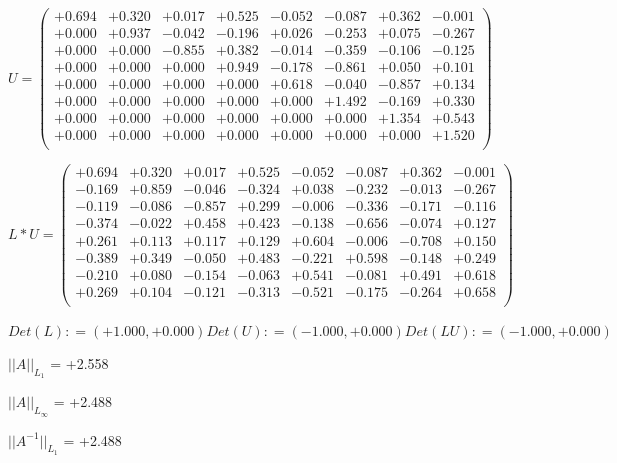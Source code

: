 \documentclass[9pt]{article}
\theoremstyle{plain}
\theoremstyle{definition}
\theoremstyle{remark}
\numberwithin{equation}{section}
\begin{document}
$U = \left(
\begin{array}{
cccccccc}
+0.694 & +0.320 & +0.017 & +0.525 & -0.052 & -0.087 & +0.362 & -0.001 \\
+0.000 & +0.937 & -0.042 & -0.196 & +0.026 & -0.253 & +0.075 & -0.267 \\
+0.000 & +0.000 & -0.855 & +0.382 & -0.014 & -0.359 & -0.106 & -0.125 \\
+0.000 & +0.000 & +0.000 & +0.949 & -0.178 & -0.861 & +0.050 & +0.101 \\
+0.000 & +0.000 & +0.000 & +0.000 & +0.618 & -0.040 & -0.857 & +0.134 \\
+0.000 & +0.000 & +0.000 & +0.000 & +0.000 & +1.492 & -0.169 & +0.330 \\
+0.000 & +0.000 & +0.000 & +0.000 & +0.000 & +0.000 & +1.354 & +0.543 \\
+0.000 & +0.000 & +0.000 & +0.000 & +0.000 & +0.000 & +0.000 & +1.520 \\
\end{array}
\right)$ \newline 

$L * U  = \left(
\begin{array}{
cccccccc}
+0.694 & +0.320 & +0.017 & +0.525 & -0.052 & -0.087 & +0.362 & -0.001 \\
-0.169 & +0.859 & -0.046 & -0.324 & +0.038 & -0.232 & -0.013 & -0.267 \\
-0.119 & -0.086 & -0.857 & +0.299 & -0.006 & -0.336 & -0.171 & -0.116 \\
-0.374 & -0.022 & +0.458 & +0.423 & -0.138 & -0.656 & -0.074 & +0.127 \\
+0.261 & +0.113 & +0.117 & +0.129 & +0.604 & -0.006 & -0.708 & +0.150 \\
-0.389 & +0.349 & -0.050 & +0.483 & -0.221 & +0.598 & -0.148 & +0.249 \\
-0.210 & +0.080 & -0.154 & -0.063 & +0.541 & -0.081 & +0.491 & +0.618 \\
+0.269 & +0.104 & -0.121 & -0.313 & -0.521 & -0.175 & -0.264 & +0.658 \\
\end{array}
\right)$ \newline 

$Det(L) :    = (+1.000,+0.000)     Det(U) :    = (-1.000,+0.000)     Det(LU) :    = (-1.000,+0.000)$

$||A||_{L_1}$  = +2.558

$||A||_{L_{\infty}}$ = +2.488

$||A^{-1}||_{L_1}$  = +2.488
\end{document}
